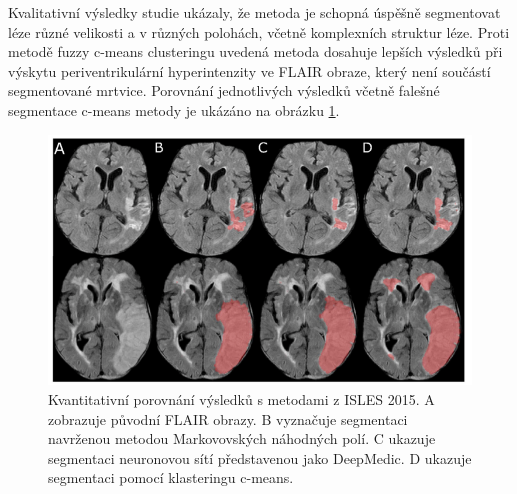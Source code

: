 \documentclass[11pt]{article}
\begin{document}
Kvalitativní výsledky studie ukázaly, že metoda je schopná úspěšně segmentovat léze různé velikosti a v různých polohách, včetně komplexních struktur léze. Proti metodě fuzzy c-means clusteringu uvedená metoda dosahuje lepších výsledků při výskytu periventrikulární hyperintenzity ve FLAIR obraze, který není součástí segmentované mrtvice. Porovnání jednotlivých výsledků včetně falešné segmentace c-means metody je ukázáno na obrázku \ref{img-mrf_vs_isles}.
\begin{figure}[htp]
	\centering
	\includegraphics[width=1\textwidth]{mrf_vs_isles}
	\caption{Kvantitativní porovnání výsledků s metodami z ISLES 2015. A zobrazuje původní FLAIR obrazy. B vyznačuje segmentaci navrženou metodou Markovovských náhodných polí. C ukazuje segmentaci neuronovou sítí představenou jako DeepMedic. D ukazuje segmentaci pomocí klasteringu c-means.}
	\label{img-mrf_vs_isles}
\end{figure}
\end{document}
